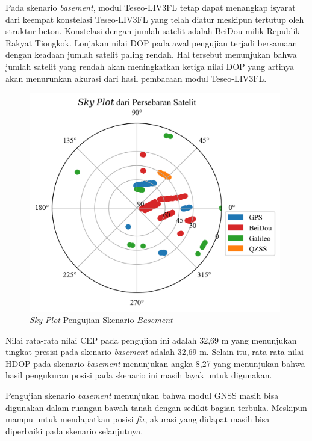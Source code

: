 Pada skenario \textit{basement}, modul Teseo-LIV3FL tetap dapat menangkap isyarat dari keempat konstelasi Teseo-LIV3FL yang telah diatur meskipun tertutup oleh struktur beton. Konstelasi dengan jumlah satelit adalah BeiDou milik Republik Rakyat Tiongkok. Lonjakan nilai DOP pada awal pengujian terjadi bersamaan dengan keadaan jumlah satelit paling rendah. Hal tersebut menunjukan bahwa jumlah satelit yang rendah akan meningkatkan ketiga nilai DOP yang artinya akan menurunkan akurasi dari hasil pembacaan modul Teseo-LIV3FL.

\begin{figure}[H]
	\centering
	\includegraphics[width=11cm]{contents/chapter-4/1-skenario-basement/skyplot.png}
	\caption{\textit{Sky Plot} Pengujian Skenario \textit{Basement}}
	\label{Fig: basement-skyplot}
\end{figure}

Nilai rata-rata nilai CEP pada pengujian ini adalah 32,69 m yang menunjukan tingkat presisi pada skenario \textit{basement} adalah 32,69 m. Selain itu, rata-rata nilai HDOP pada skenario \textit{basement} menunjukan angka 8,27 yang menunjukan bahwa hasil pengukuran posisi pada skenario ini masih layak untuk digunakan.

Pengujian skenario \textit{basement} menunjukan bahwa modul GNSS masih bisa digunakan dalam ruangan bawah tanah dengan sedikit bagian terbuka. Meskipun mampu untuk mendapatkan posisi \textit{fix}, akurasi yang didapat masih bisa diperbaiki pada skenario selanjutnya.

